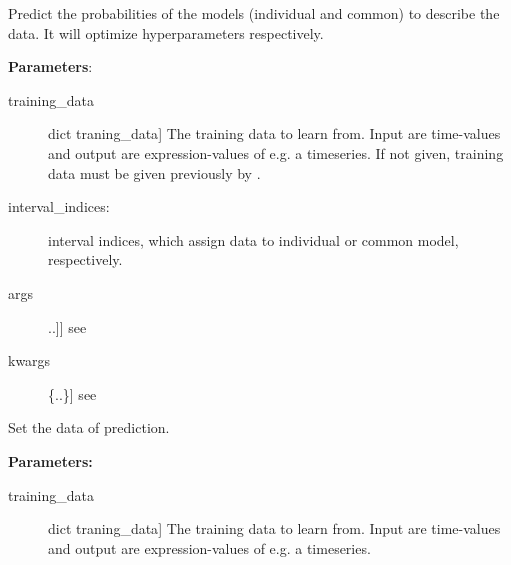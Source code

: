 \documentclass[letterpaper,10pt,english]{sphinxmanual}
\begin{document}
\begin{fulllineitems}
\begin{fulllineitems}
\end{fulllineitems}


\begin{fulllineitems}
\label{base:gptwosample.twosample.twosample_base.TwoSampleBase.predict_model_likelihoods}
Predict the probabilities of the models (individual and common) to describe the data.
It will optimize hyperparameters respectively.

\textbf{Parameters}:
\begin{description}
\item[{training\_data}] \leavevmode{[}dict traning\_data{]}
The training data to learn from. Input are time-values and
output are expression-values of e.g. a timeseries.
If not given, training data must be given previously by
.

\item[{interval\_indices: {\hyperref[data:gptwosample.data.data_base.get_model_structure]{}}}] \leavevmode
interval indices, which assign data to individual or common model,
respectively.

\item[{args}] \leavevmode{[}{[}..{]}{]}
see 

\item[{kwargs}] \leavevmode{[}\{..\}{]}
see 

\end{description}

\end{fulllineitems}


\begin{fulllineitems}
\label{base:gptwosample.twosample.twosample_base.TwoSampleBase.set_data}
Set the data of prediction.

\textbf{Parameters:}
\begin{description}
\item[{training\_data}] \leavevmode{[}dict traning\_data{]}
The training data to learn from. Input are time-values and
output are expression-values of e.g. a timeseries.


\end{description}
\end{fulllineitems}
\end{fulllineitems}
\end{document}
